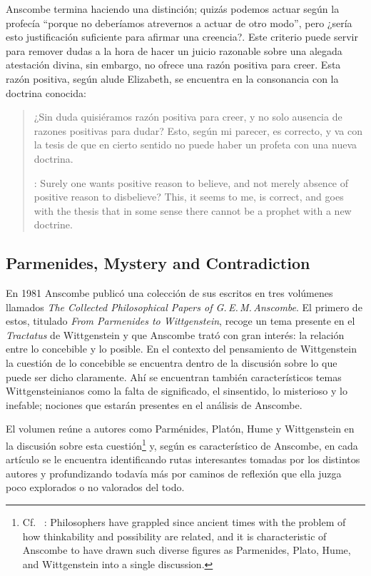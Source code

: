 Anscombe termina haciendo una distinción; quizás podemos actuar según la
profecía \enquote{porque no deberíamos atrevernos a actuar de otro modo}, pero
¿sería esto justificación suficiente para afirmar una creencia?. Este criterio
puede servir para remover dudas a la hora de hacer un juicio razonable sobre una
alegada atestación divina, sin embargo, no ofrece una razón positiva para creer.
Esta razón positiva, según alude Elizabeth, se encuentra en la consonancia con
la doctrina conocida: \blockquote[{\cite[39]{anscombe2008faith:prophandmi}}:
Surely one wants positive reason to believe, and not merely absence of positive
reason to disbelieve? This, it seems to me, is correct, and goes with the thesis
that in some sense there cannot be a prophet with a new doctrine. ]{¿Sin duda
  quisiéramos razón positiva para creer, y no solo ausencia de razones positivas
  para dudar? Esto, según mi parecer, es correcto, y va con la tesis de que en
  cierto sentido no puede haber un profeta con una nueva doctrina.}

\subsection{Parmenides, Mystery and Contradiction}

En 1981 Anscombe publicó una colección de sus escritos en tres volúmenes
llamados \emph{The Collected Philosophical Papers of G.\,E.\,M.\,Anscombe}. El
primero de estos, titulado \emph{From Parmenides to Wittgenstein}, recoge un tema
presente en el \emph{Tractatus} de Wittgenstein y que Anscombe trató con gran
interés: la relación entre lo concebible y lo posible. En el contexto del
pensamiento de Wittgenstein la cuestión de lo concebible se encuentra dentro de
la discusión sobre lo que puede ser dicho claramente. Ahí se encuentran también
característicos temas Wittgensteinianos como la falta de significado, el
sinsentido, lo misterioso y lo inefable; nociones que estarán presentes en el
análisis de Anscombe.

El volumen reúne a autores como Parménides, Platón, Hume y Wittgenstein en la
discusión sobre esta cuestión\footnote{Cf.~ \cite[193]{teichmann2008ans}:
  Philosophers have grappled since ancient times with the problem of how
  thinkability and possibility are related, and it is characteristic of Anscombe
  to have drawn such diverse figures as Parmenides, Plato, Hume, and
  Wittgenstein into a single discussion.} y, según es característico de
Anscombe, en cada artículo se le encuentra identificando rutas interesantes
tomadas por los distintos autores y profundizando todavía más por caminos de
reflexión que ella juzga poco explorados o no valorados del todo.

